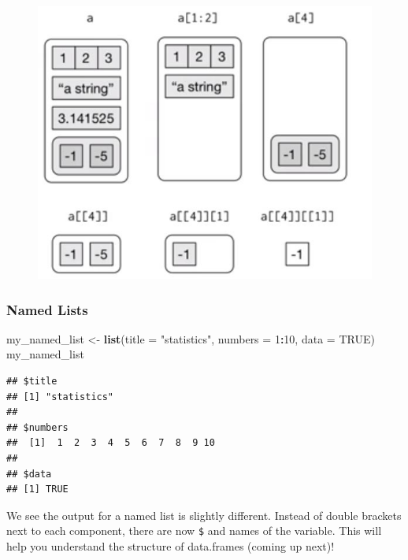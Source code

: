 \documentclass[]{article}
\newenvironment{Shaded}{\begin{snugshade}}{\end{snugshade}}
\newcommand{\KeywordTok}[1]{\textcolor[rgb]{0.13,0.29,0.53}{\textbf{#1}}}
\newcommand{\DataTypeTok}[1]{\textcolor[rgb]{0.13,0.29,0.53}{#1}}
\newcommand{\DecValTok}[1]{\textcolor[rgb]{0.00,0.00,0.81}{#1}}
\newcommand{\StringTok}[1]{\textcolor[rgb]{0.31,0.60,0.02}{#1}}
\newcommand{\OtherTok}[1]{\textcolor[rgb]{0.56,0.35,0.01}{#1}}
\newcommand{\OperatorTok}[1]{\textcolor[rgb]{0.81,0.36,0.00}{\textbf{#1}}}
\newcommand{\NormalTok}[1]{#1}
\begin{document}
\begin{figure}
\centering
\includegraphics{images/list_example.JPG}
\caption{}
\end{figure}

\vspace{0.5cm}

\subsubsection{Named Lists}\label{named-lists}

\begin{Shaded}
\begin{Highlighting}[]
\NormalTok{my_named_list <-}\StringTok{ }\KeywordTok{list}\NormalTok{(}\DataTypeTok{title =} \StringTok{"statistics"}\NormalTok{, }\DataTypeTok{numbers =} \DecValTok{1}\OperatorTok{:}\DecValTok{10}\NormalTok{, }\DataTypeTok{data =} \OtherTok{TRUE}\NormalTok{)}
\NormalTok{my_named_list}
\end{Highlighting}
\end{Shaded}

\begin{verbatim}
## $title
## [1] "statistics"
## 
## $numbers
##  [1]  1  2  3  4  5  6  7  8  9 10
## 
## $data
## [1] TRUE
\end{verbatim}

\vspace{0.25cm}

We see the output for a named list is slightly different. Instead of
double brackets next to each component, there are now \texttt{\$} and
names of the variable. This will help you understand the structure of
data.frames (coming up next)!
\end{document}
